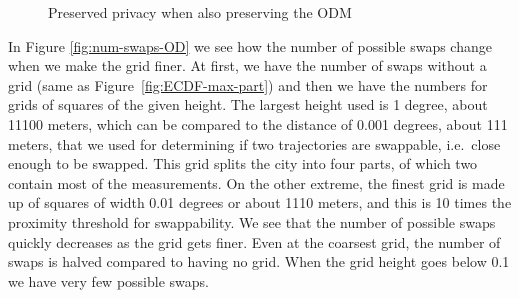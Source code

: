 \documentclass[review]{elsarticle}
\begin{document}
\begin{figure}
  \hfil
  \caption{Preserved privacy when also preserving the ODM}
  \label{fig:OD}
\end{figure}

In Figure \ref{fig:num-swaps-OD} we see how the number of possible
swaps change when we make the grid finer. At first, we have the number
of swaps without a grid (same as Figure~\ref{fig:ECDF-max-part}) and then we have the numbers for grids of
squares of the given height. The largest height used is 1 degree, about
11100 meters, which can be compared to the distance of 0.001 degrees,
about 111 meters, that we used for determining if two trajectories are swappable, i.e.~close enough to be swapped.  
This grid splits the city into four parts, of which two contain
most of the measurements. On the other extreme, the finest grid is made up of squares of width 0.01 degrees or about 1110 meters, and this is 10 times the proximity threshold for swappability.  
We see that the number of possible swaps quickly decreases as the grid
gets finer. Even at the coarsest grid, the number of swaps is halved
compared to having no grid. When the grid height goes below 0.1 we have
very few possible swaps.
\end{document}
